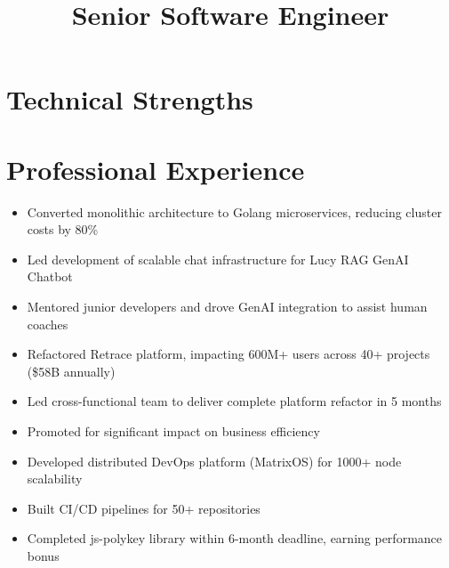 \documentclass[11pt,a4paper,sans]{moderncv}
\title{Senior Software Engineer}
\begin{document}
\makecvtitle

\section{Technical Strengths}

\section{Professional Experience}
{
    \begin{itemize}
        \item Converted monolithic architecture to Golang microservices, reducing cluster costs by 80\%
        \item Led development of scalable chat infrastructure for Lucy RAG GenAI Chatbot
        \item Mentored junior developers and drove GenAI integration to assist human coaches
    \end{itemize}
}

{
    \begin{itemize}
        \item Refactored Retrace platform, impacting 600M+ users across 40+ projects (\$58B annually)
        \item Led cross-functional team to deliver complete platform refactor in 5 months
        \item Promoted for significant impact on business efficiency
    \end{itemize}
}

{
    \begin{itemize}
        \item Developed distributed DevOps platform (MatrixOS) for 1000+ node scalability
        \item Built CI/CD pipelines for 50+ repositories
        \item Completed js-polykey library within 6-month deadline, earning performance bonus
    \end{itemize}
}
\end{document}

